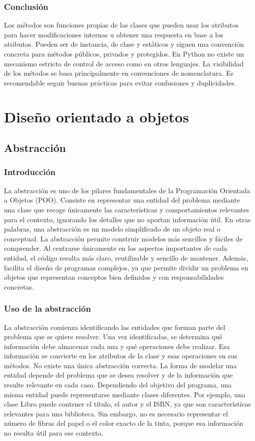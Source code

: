\documentclass[11pt,a5paper,twoside]{book}
\begin{document}
\subsection{Conclusión}
Los métodos son funciones propias de las clases que pueden usar los atributos para hacer modificaciones internas u obtener una respuesta en base a los atributos.
Pueden ser de instancia, de clase y estáticos y siguen una convención concreta para métodos públicos, privados y protegidos. En Python no existe un mecanismo estricto de control de acceso como en otros lenguajes. La visibilidad de los métodos se basa principalmente en convenciones de nomenclatura.
Es recomendable seguir buenas prácticas para evitar confusiones y duplicidades.

\newpage


\chapter{Diseño orientado a objetos}

\section{Abstracción}
\subsection{Introducción}
La abstracción es uno de los pilares fundamentales de la Programación Orientada a Objetos (POO). Consiste en representar una entidad del problema mediante una clase que recoge únicamente las características y comportamientos relevantes para el contexto, ignorando los detalles que no aportan información útil.
En otras palabras, una abstracción es un modelo simplificado de un objeto real o conceptual.
La abstracción permite construir modelos más sencillos y fáciles de comprender. Al centrarse únicamente en los aspectos importantes de cada entidad, el código resulta más claro, reutilizable y sencillo de mantener.
Además, facilita el diseño de programas complejos, ya que permite dividir un problema en objetos que representan conceptos bien definidos y con responsabilidades concretas.
\subsection{Uso de la abstracción}
La abstracción comienza identificando las entidades que forman parte del problema que se quiere resolver.
Una vez identificadas, se determina qué información debe almacenar cada una y qué operaciones debe realizar. Esa información se convierte en los atributos de la clase y esas operaciones en sus métodos.
No existe una única abstracción correcta. La forma de modelar una entidad depende del problema que se desea resolver y de la información que resulte relevante en cada caso. Dependiendo del objetivo del programa, una misma entidad puede representarse mediante clases diferentes.
Por ejemplo, una clase Libro puede contener el título, el autor y el ISBN, ya que son características relevantes para una biblioteca. Sin embargo, no es necesario representar el número de fibras del papel o el color exacto de la tinta, porque esa información no resulta útil para ese contexto.
\end{document}
